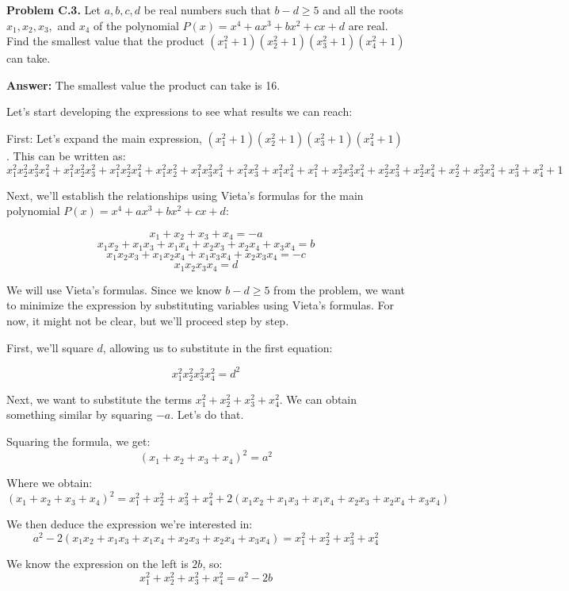 \documentclass{article}
\begin{document}
\textbf{Problem C.3.} Let \( a, b, c, d \) be real numbers such that \( b - d \geq 5 \) and all the roots \( x_1, x_2, x_3, \) and \( x_4 \) of the polynomial \( P(x) = x^4 + ax^3 + bx^2 + cx + d \) are real. Find the smallest value that the product \((x_1^2 + 1)(x_2^2 + 1)(x_3^2 + 1)(x_4^2 + 1)\) can take.

\textbf{Answer:} The smallest value the product can take is 16.

Let's start developing the expressions to see what results we can reach:

First: Let's expand the main expression, \((x_1^2 + 1)(x_2^2 + 1)(x_3^2 + 1)(x_4^2 + 1)\). This can be written as:
\[
x_1^2 x_2^2 x_3^2 x_4^2 + x_1^2 x_2^2 x_3^2 + x_1^2 x_2^2 x_4^2 + x_1^2 x_2^2 + x_1^2 x_3^2 x_4^2 + x_1^2 x_3^2 + x_1^2 x_4^2 + x_1^2 + x_2^2 x_3^2 x_4^2 + x_2^2 x_3^2 + x_2^2 x_4^2 + x_2^2 + x_3^2 x_4^2 + x_3^2 + x_4^2 + 1
\]

Next, we'll establish the relationships using Vieta's formulas for the main polynomial \( P(x) = x^4 + ax^3 + bx^2 + cx + d \):

\[
x_1 + x_2 + x_3 + x_4 = -a
\]
\[
x_1x_2 + x_1x_3 + x_1x_4 + x_2x_3 + x_2x_4 + x_3x_4 = b
\]
\[
x_1x_2x_3 + x_1x_2x_4 + x_1x_3x_4 + x_2x_3x_4 = -c
\]
\[
x_1x_2x_3x_4 = d
\]

We will use Vieta's formulas. Since we know \( b - d \geq 5 \) from the problem, we want to minimize the expression by substituting variables using Vieta's formulas. For now, it might not be clear, but we'll proceed step by step. 

First, we'll square \( d \), allowing us to substitute in the first equation:

\[
x_1^2 x_2^2 x_3^2 x_4^2 = d^2
\]

Next, we want to substitute the terms \( x_1^2 + x_2^2 + x_3^2 + x_4^2 \). We can obtain something similar by squaring \( -a \). Let's do that.

Squaring the formula, we get:
\[
(x_1 + x_2 + x_3 + x_4)^2 = a^2
\]

Where we obtain:
\[
(x_1 + x_2 + x_3 + x_4)^2 = x_1^2 + x_2^2 + x_3^2 + x_4^2 + 2(x_1x_2 + x_1x_3 + x_1x_4 + x_2x_3 + x_2x_4 + x_3x_4)
\]

We then deduce the expression we're interested in:
\[
a^2 - 2(x_1x_2 + x_1x_3 + x_1x_4 + x_2x_3 + x_2x_4 + x_3x_4) = x_1^2 + x_2^2 + x_3^2 + x_4^2
\]

We know the expression on the left is \( 2b \), so:
\[
x_1^2 + x_2^2 + x_3^2 + x_4^2 = a^2 - 2b
\]
\end{document}
